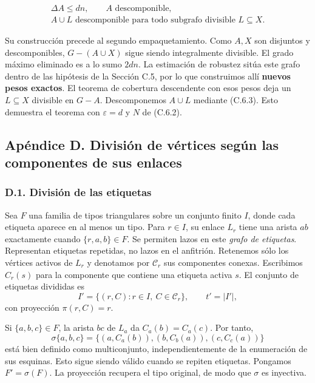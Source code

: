 \documentclass[spanish,11pt,a4paper]{article}
\begin{document}
\[\begin{gathered}
\Delta A\le dn,\qquad A\text{ descomponible},\\
A\cup L\text{ descomponible para todo subgrafo divisible }L\subseteq X.
\end{gathered}
\tag{C.6.3}\]

Su construcción precede al segundo empaquetamiento. Como \(A,X\) son disjuntos y descomponibles, \(G-(A\cup X)\) sigue siendo integralmente divisible. El grado máximo eliminado es a lo sumo \(2dn\). La estimación de robustez sitúa este grafo dentro de las hipótesis de la Sección C.5, por lo que construimos allí \textbf{nuevos pesos exactos}. El teorema de cobertura descendente con esos pesos deja un \(L\subseteq X\) divisible en \(G-A\). Descomponemos \(A\cup L\) mediante (C.6.3). Esto demuestra el teorema con \(\varepsilon=d\) y \(N\) de (C.6.2).

\bigskip

\subsection{Apéndice D. División de vértices según las componentes de sus enlaces}\label{apuxe9ndice-d.-divisiuxf3n-de-vuxe9rtices-seguxfan-las-componentes-de-sus-enlaces}

\subsubsection{D.1. División de las etiquetas}\label{d.1.-divisiuxf3n-de-las-etiquetas}

Sea \(F\) una familia de tipos triangulares sobre un conjunto finito \(I\), donde cada etiqueta aparece en al menos un tipo. Para \(r\in I\), su enlace \(L_r\) tiene una arista \(ab\) exactamente cuando \(\{r,a,b\}\in F\). Se permiten lazos en este \emph{grafo de etiquetas}. Representan etiquetas repetidas, no lazos en el anfitrión. Retenemos sólo los vértices activos de \(L_r\) y denotamos por \(\mathcal C_r\) sus componentes conexas. Escribimos \(C_r(s)\) para la componente que contiene una etiqueta activa \(s\). El conjunto de etiquetas divididas es \[I'=\{(r,C):r\in I,\ C\in\mathcal C_r\},\qquad t'=|I'|,\] con proyección \(\pi(r,C)=r\).

Si \(\{a,b,c\}\in F\), la arista \(bc\) de \(L_a\) da \(C_a(b)=C_a(c)\). Por tanto, \[\sigma\{a,b,c\}
=\{(a,C_a(b)),(b,C_b(a)),(c,C_c(a))\}
\tag{D.1.1}\] está bien definido como multiconjunto, independientemente de la enumeración de sus esquinas. Esto sigue siendo válido cuando se repiten etiquetas. Pongamos \(F'=\sigma(F)\). La proyección recupera el tipo original, de modo que \(\sigma\) es inyectiva.
\end{document}

